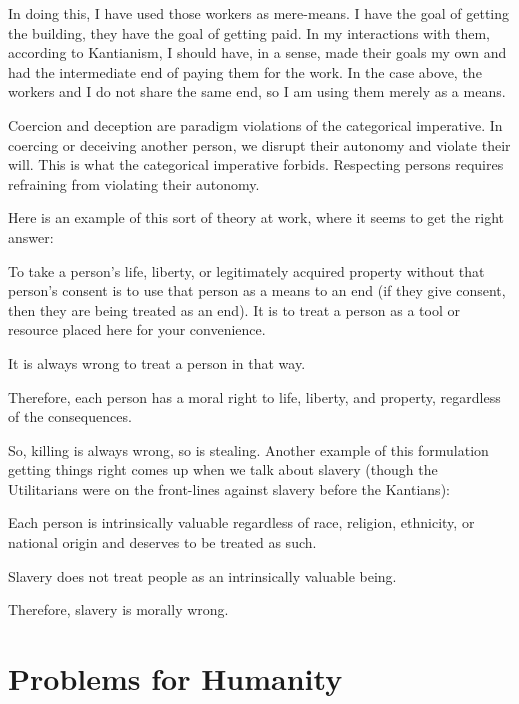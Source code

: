 In doing this, I have used those workers as mere-means. I have the goal of getting the building, they have the goal of getting paid. In my interactions with them, according to Kantianism, I should have, in a sense, made their goals my own and had the intermediate end of paying them for the work. In the case above, the workers and I do not share the same end, so I am using them merely as a means.

Coercion and deception are paradigm violations of the categorical imperative. In coercing or deceiving another person, we disrupt their autonomy and violate their will. This is what the categorical imperative forbids. Respecting persons requires refraining from violating their autonomy.

Here is an example of this sort of theory at work, where it seems to get the right answer:
\begin{earg}
    \item[] To take a person’s life, liberty, or legitimately acquired property without that person’s consent is to use that person as a means to an end (if they give consent, then they are being treated as an end). It is to treat a person as a tool or resource placed here for your convenience.
    \item[] It is always wrong to treat a person in that way.
    \item[] Therefore, each person has a moral right to life, liberty, and property, regardless of the consequences.
\end{earg}
So, killing is always wrong, so is stealing. Another example of this formulation getting things right comes up when we talk about slavery (though the Utilitarians were on the front-lines against slavery before the Kantians):
\begin{earg}
    \item[] Each person is intrinsically valuable regardless of race, religion, ethnicity, or national origin and deserves to be treated as such.
    \item[] Slavery does not treat people as an intrinsically valuable being.
    \item[] Therefore, slavery is morally wrong.
\end{earg}
\section{Problems for Humanity}
